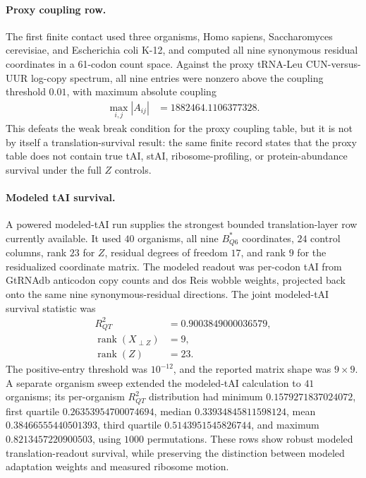 \paragraph{Proxy coupling row.}
The first finite contact used three organisms, Homo sapiens, Saccharomyces cerevisiae, and Escherichia coli K-12, and computed all nine synonymous residual coordinates in a 61-codon count space.  Against the proxy tRNA-Leu CUN-versus-UUR log-copy spectrum, all nine entries were nonzero above the coupling threshold $0.01$, with maximum absolute coupling
$$
\begin{aligned}
\max_{i,j}|A_{ij}| &= 1882464.1106377328.
\end{aligned}
$$
This defeats the weak break condition for the proxy coupling table, but it is not by itself a translation-survival result: the same finite record states that the proxy table does not contain true tAI, stAI, ribosome-profiling, or protein-abundance survival under the full $Z$ controls.

\paragraph{Modeled tAI survival.}
A powered modeled-tAI run supplies the strongest bounded translation-layer row currently available.  It used $40$ organisms, all nine $B^{\ast}_{Q6}$ coordinates, $24$ control columns, rank $23$ for $Z$, residual degrees of freedom $17$, and rank $9$ for the residualized coordinate matrix.  The modeled readout was per-codon tAI from GtRNAdb anticodon copy counts and dos Reis wobble weights, projected back onto the same nine synonymous-residual directions.  The joint modeled-tAI survival statistic was
$$
\begin{aligned}
R^2_{QT} &= 0.9003849000036579,\\
\operatorname{rank}(X_{\perp Z}) &= 9,\\
\operatorname{rank}(Z) &= 23.
\end{aligned}
$$
The positive-entry threshold was $10^{-12}$, and the reported matrix shape was $9\times 9$.  A separate organism sweep extended the modeled-tAI calculation to $41$ organisms; its per-organism $R^2_{QT}$ distribution had minimum $0.1579271837024072$, first quartile $0.26353954700074694$, median $0.33934845811598124$, mean $0.38466555440501393$, third quartile $0.5143951545826744$, and maximum $0.8213457220900503$, using $1000$ permutations.  These rows show robust modeled translation-readout survival, while preserving the distinction between modeled adaptation weights and measured ribosome motion.

